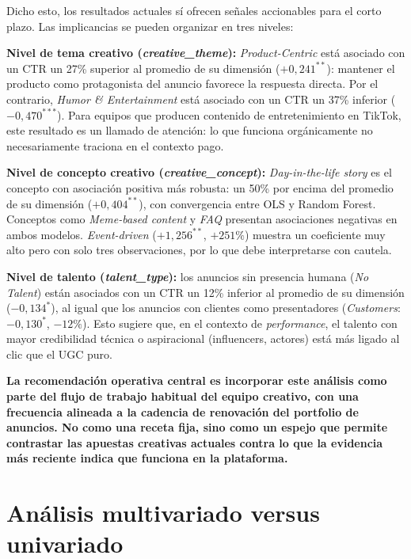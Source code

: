 \documentclass[12pt, a4paper]{report}
\begin{document}
Dicho esto, los resultados actuales sí ofrecen señales accionables para el corto plazo.
Las implicancias se pueden organizar en tres niveles:

\textbf{Nivel de tema creativo (\textit{creative\_theme}):} \textit{Product-Centric} está
asociado con un CTR un 27\% superior al promedio de su dimensión ($+0{,}241^{**}$):
mantener el producto como protagonista del anuncio favorece la respuesta directa. Por el
contrario, \textit{Humor \& Entertainment} está asociado con un CTR un 37\% inferior
($-0{,}470^{***}$). Para equipos que producen contenido de entretenimiento en TikTok,
este resultado es un llamado de atención: lo que funciona orgánicamente no necesariamente
traciona en el contexto pago.

\textbf{Nivel de concepto creativo (\textit{creative\_concept}):} \textit{Day-in-the-life
story} es el concepto con asociación positiva más robusta: un 50\% por encima del promedio
de su dimensión ($+0{,}404^{**}$), con convergencia entre OLS y Random Forest. Conceptos
como \textit{Meme-based content} y \textit{FAQ} presentan asociaciones negativas en ambos
modelos. \textit{Event-driven} ($+1{,}256^{**}$, $+251\%$) muestra un coeficiente muy alto
pero con solo tres observaciones, por lo que debe interpretarse con cautela.

\textbf{Nivel de talento (\textit{talent\_type}):} los anuncios sin presencia humana
(\textit{No Talent}) están asociados con un CTR un 12\% inferior al promedio de su
dimensión ($-0{,}134^{*}$), al igual que los anuncios con clientes como presentadores
(\textit{Customers}: $-0{,}130^{*}$, $-12\%$). Esto sugiere que, en el contexto de
\textit{performance}, el talento con mayor credibilidad técnica o aspiracional (influencers,
actores) está más ligado al clic que el UGC puro.

\textbf{La recomendación operativa central es incorporar este análisis como parte del flujo de
trabajo habitual del equipo creativo, con una frecuencia alineada a la cadencia de
renovación del portfolio de anuncios. No como una receta fija, sino como un espejo que
permite contrastar las apuestas creativas actuales contra lo que la evidencia más reciente
indica que funciona en la plataforma.}

\section{Análisis multivariado versus univariado}
\end{document}
